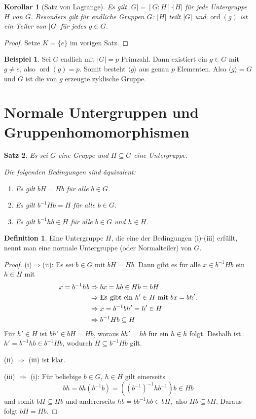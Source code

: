 \documentclass[12pt]{scrartcl} %
\DeclareMathOperator{\ord}{ord}
\newtheorem{thm}{Satz}[section]
\newtheorem{kor}[thm]{Korollar}
\theoremstyle{definition}
\newtheorem*{defn}{Definition}
\newtheorem{ex}{Beispiel}
\theoremstyle{remark}
\begin{document}
\begin{kor}[Satz von Lagrange]
	Es gilt $\vert G\vert = [G:H]\cdot\vert H\vert$ für jede Untergruppe $H$ von $G$.
	Besonders gilt für endliche Gruppen $G$: $\vert H\vert$ teilt $\vert G\vert$ und $\ord(g)$ ist ein Teiler von $\vert G\vert$ für jedes $g\in G$.
\end{kor}

\begin{proof}
	Setze $K = \{e\}$ im vorigen Satz.
\end{proof}

\begin{ex}
	Sei $G$ endlich mit $\vert G\vert=p$ Primzahl.
	Dann existiert ein $g \in G$ mit $g \neq e$, also $\ord(g)=p$.
	Somit besteht $\langle g\rangle$ aus genau $p$ Elementen.
	Also $\langle g\rangle=G$ und $G$ ist die von $g$ erzeugte zyklische Gruppe.
\end{ex}

\section{Normale Untergruppen und Gruppenhomomorphismen}

\begin{thm}
	Es sei $G$ eine Gruppe und $H\subseteq G$ eine Untergruppe.

	Die folgenden Bedingungen sind äquivalent:
	\begin{enumerate}[label=(\roman*)]
	\item Es gilt $bH=Hb$ für alle $b\in G$.
	\item Es gilt $b^{-1}Hb=H$ für alle $b\in G$.
	\item Es gilt $b^{-1}hb \in H$ für alle $b\in G$ und $h\in H$.
	\end{enumerate}
\end{thm}

\begin{defn}
	Eine Untergruppe $H$, die eine der Bedingungen (i)-(iii) erfüllt, nennt man eine normale Untergruppe (oder Normalteiler) von $G$.
\end{defn}

\begin{proof}
	(i)$\Rightarrow$(ii):
	Es sei $b \in G$ mit $bH=Hb$.
	Dann gibt es für alle $x \in b^{-1}Hb$ ein \(h \in H\) mit
	\begin{align*}
		x=b^{-1}hb &\Rightarrow bx=hb \in Hb=bH\\
		&\Rightarrow \text{Es gibt ein \(h' \in H$ mit $bx=bh'\).}\\
		&\Rightarrow x=b^{-1}bh'=h'\in H\\
		&\Rightarrow b^{-1}Hb \subseteq H
	\end{align*}
	Für $h' \in H$ ist $bh' \in bH = Hb$, woraus $bh'=hb$ für ein $h \in h$ folgt.
	Deshalb ist $h'=b^{-1}hb \in b^{-1}Hb$, wodurch $H \subseteq b^{-1}Hb$ gilt.

	(ii) $\Rightarrow$ (iii) ist klar.

	(iii) $\Rightarrow$ (i):
	Für beliebige $b \in G$, $h\in H$ gilt einerseits
	\[bh=bh(b^{-1}b)=((b^{-1})^{-1}hb^{-1})b \in Hb\]
	und somit \(bH \subseteq Hb\) und andererseits \(hb=bb^{-1}hb \in bH,\) also \(Hb \subseteq bH\).
	Daraus folgt $bH=Hb$.
\end{proof}
\end{document}
